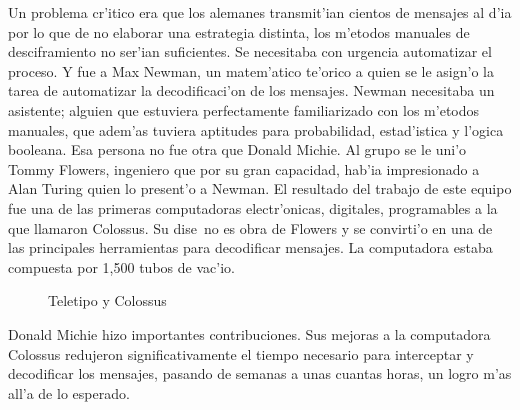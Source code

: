 \documentclass[11pt]{article}
\begin{document}
Un problema cr'itico era que los alemanes transmit'ian cientos de mensajes al d'ia por lo que de no elaborar una estrategia distinta, los m'etodos manuales de desciframiento no ser'ian suficientes. Se necesitaba con urgencia automatizar el proceso. Y fue a Max Newman, un matem'atico te'orico a quien se le asign'o la tarea de automatizar la decodificaci'on de los mensajes. Newman necesitaba un asistente; alguien que estuviera perfectamente familiarizado con los m'etodos manuales, que adem'as tuviera aptitudes para probabilidad, estad'istica y l'ogica booleana. Esa persona no fue otra que Donald Michie. Al grupo se le uni'o Tommy Flowers, ingeniero que por su gran capacidad, hab'ia impresionado a Alan Turing quien lo present'o a Newman. El resultado del trabajo de este equipo fue una de las primeras computadoras electr'onicas, digitales, programables a la que llamaron Colossus. Su dise~no es obra de Flowers y se convirti'o en una de las principales herramientas para decodificar mensajes. La computadora estaba compuesta por 1,500 tubos de vac'io. 



\begin{figure}[h]
\begin{center}

\caption{Teletipo y Colossus}
  \label{fig:teletipocolossus}
\end{center}
\end{figure} 

Donald Michie hizo importantes contribuciones. Sus mejoras a la computadora Colossus redujeron significativamente el tiempo necesario para interceptar y decodificar los mensajes, pasando de semanas a unas cuantas horas, un logro m'as all'a de lo esperado.
\end{document}
